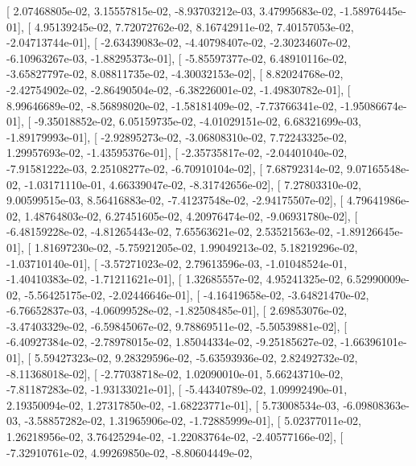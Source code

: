\documentclass{article}
\begin{document}
       [  2.07468805e-02,   3.15557815e-02,  -8.93703212e-03,
          3.47995683e-02,  -1.58976445e-01],
       [  4.95139245e-02,   7.72072762e-02,   8.16742911e-02,
          7.40157053e-02,  -2.04713744e-01],
       [ -2.63439083e-02,  -4.40798407e-02,  -2.30234607e-02,
         -6.10963267e-03,  -1.88295373e-01],
       [ -5.85597377e-02,   6.48910116e-02,  -3.65827797e-02,
          8.08811735e-02,  -4.30032153e-02],
       [  8.82024768e-02,  -2.42754902e-02,  -2.86490504e-02,
         -6.38226001e-02,  -1.49830782e-01],
       [  8.99646689e-02,  -8.56898020e-02,  -1.58181409e-02,
         -7.73766341e-02,  -1.95086674e-01],
       [ -9.35018852e-02,   6.05159735e-02,  -4.01029151e-02,
          6.68321699e-03,  -1.89179993e-01],
       [ -2.92895273e-02,  -3.06808310e-02,   7.72243325e-02,
          1.29957693e-02,  -1.43595376e-01],
       [ -2.35735817e-02,  -2.04401040e-02,  -7.91581222e-03,
          2.25108277e-02,  -6.70910104e-02],
       [  7.68792314e-02,   9.07165548e-02,  -1.03171110e-01,
          4.66339047e-02,  -8.31742656e-02],
       [  7.27803310e-02,   9.00599515e-03,   8.56416883e-02,
         -7.41237548e-02,  -2.94175507e-02],
       [  4.79641986e-02,   1.48764803e-02,   6.27451605e-02,
          4.20976474e-02,  -9.06931780e-02],
       [ -6.48159228e-02,  -4.81265443e-02,   7.65563621e-02,
          2.53521563e-02,  -1.89126645e-01],
       [  1.81697230e-02,  -5.75921205e-02,   1.99049213e-02,
          5.18219296e-02,  -1.03710140e-01],
       [ -3.57271023e-02,   2.79613596e-03,  -1.01048524e-01,
         -1.40410383e-02,  -1.71211621e-01],
       [  1.32685557e-02,   4.95241325e-02,   6.52990009e-02,
         -5.56425175e-02,  -2.02446646e-01],
       [ -4.16419658e-02,  -3.64821470e-02,  -6.76652837e-03,
         -4.06099528e-02,  -1.82508485e-01],
       [  2.69853076e-02,  -3.47403329e-02,  -6.59845067e-02,
          9.78869511e-02,  -5.50539881e-02],
       [ -6.40927384e-02,  -2.78978015e-02,   1.85044334e-02,
         -9.25185627e-02,  -1.66396101e-01],
       [  5.59427323e-02,   9.28329596e-02,  -5.63593936e-02,
          2.82492732e-02,  -8.11368018e-02],
       [ -2.77038718e-02,   1.02090010e-01,   5.66243710e-02,
         -7.81187283e-02,  -1.93133021e-01],
       [ -5.44340789e-02,   1.09992490e-01,   2.19350094e-02,
          1.27317850e-02,  -1.68223771e-01],
       [  5.73008534e-03,  -6.09808363e-03,  -3.58857282e-02,
          1.31965906e-02,  -1.72885999e-01],
       [  5.02377011e-02,   1.26218956e-02,   3.76425294e-02,
         -1.22083764e-02,  -2.40577166e-02],
       [ -7.32910761e-02,   4.99269850e-02,  -8.80604449e-02,
\end{document}

